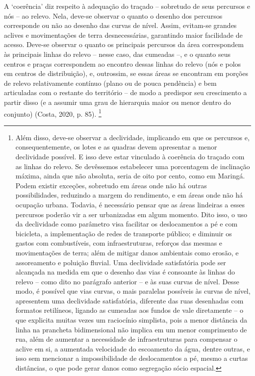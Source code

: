 \documentclass[12pt, a4paper]{book} %
\begin{document}
        A `coerência' diz respeito à adequação do traçado – sobretudo de seus percursos e nós – ao relevo. Nela, deve-se observar o quanto o desenho dos percursos corresponde ou não ao desenho das curvas de nível. Assim, evitam-se grandes aclives e movimentações de terra desnecessárias, garantindo maior facilidade de acesso. Deve-se observar o quanto os principais percursos da área correspondem às principais linhas do relevo – nesse caso, das cumeadas –, e o quanto seus centros e praças correspondem ao encontro dessas linhas do relevo (nós e polos em centros de distribuição), e, outrossim, se essas áreas se encontram em porções de relevo relativamente contínuo (plano ou de pouca pendência) e bem articuladas com o restante do território – de modo a predispor seu crescimento a partir disso (e a assumir uma grau de hierarquia maior ou menor dentro do conjunto) (Costa, 2020, p. 85). \footnote[24]{Além disso, deve-se observar a declividade, implicando em que os percursos e, consequentemente, os lotes e as quadras devem apresentar a menor declividade possível. E isso deve estar vinculado à coerência do traçado com as linhas do relevo. Se devêssemos estabelecer uma porcentagem de inclinação máxima, ainda que não absoluta, seria de oito por cento, como em Maringá. Podem existir exceções, sobretudo em áreas onde não há outras possibilidades, reduzindo a margem do rendimento, e em áreas onde não há ocupação urbana. Todavia, é necessário pensar que as áreas lindeiras a esses percursos poderão vir a ser urbanizadas em algum momento. Dito isso, o uso da declividade como parâmetro visa facilitar os deslocamentos a pé e com bicicleta, a implementação de redes de transporte público; e diminuir os gastos com combustíveis, com infraestruturas, reforços das mesmas e movimentações de terra; além de mitigar danos ambientais como erosão, e assoreamento e poluição fluvial. Uma declividade satisfatória pode ser alcançada na medida em que o desenho das vias é consoante às linhas do relevo – como dito no parágrafo anterior – e às suas curvas de nível. Desse modo, é possível que vias curvas, o mais paralelas possíveis às curvas de nível, apresentem uma declividade satisfatória, diferente das ruas desenhadas com formatos retilíneos, ligando as cumeadas aos fundos de vale diretamente – o que explicita muitas vezes um raciocínio simplista, pois a menor distância da linha na prancheta bidimensional não implica em um menor comprimento de rua, além de aumentar a necessidade de infraestruturas para compensar o aclive em si, a aumentada velocidade do escoamento da água, dentre outras, e isso sem mencionar a impossibilidade de deslocamentos a pé, mesmo a curtas distâncias, o que pode gerar danos como segregação sócio espacial.}
\end{document}

